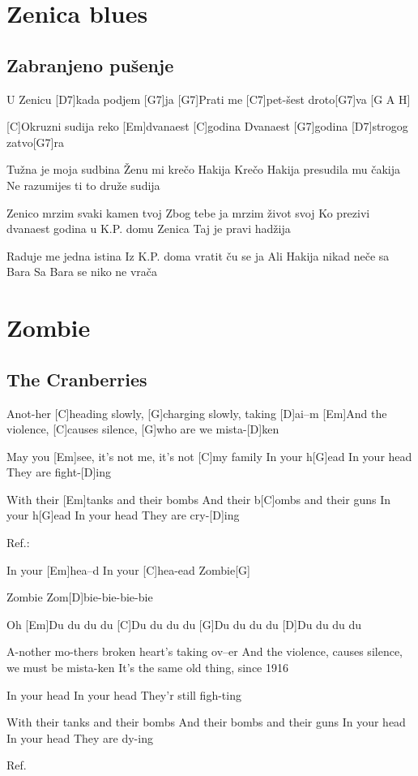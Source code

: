 \documentclass[a4paper,12pt]{article}
\begin{document}
\begin{multicols}{2}
\begin{guitar}
\end{guitar}
\section{Zenica blues}
\subsection*{Zabranjeno pušenje}
\begin{guitar}
[G7]U Zenicu [D7]kada podjem [G7]ja
[G7]Prati me [C7]pet-šest droto[G7]va [G A H]

[C]Okruzni sudija reko [Em]dvanaest [C]godina   
Dvanaest [G7]godina [D7]strogog zatvo[G7]ra      


Tužna je moja sudbina
Ženu mi krečo Hakija
Krečo Hakija presudila mu čakija
Ne razumijes ti to druže sudija


Zenico mrzim svaki kamen tvoj
Zbog tebe ja mrzim život svoj
Ko prezivi dvanaest godina 
u K.P. domu Zenica
Taj je pravi hadžija


Raduje me jedna istina
Iz K.P. doma vratit ču se ja
Ali Hakija nikad neče sa Bara
Sa Bara se niko ne vrača

\end{guitar}
\section{Zombie}
\subsection*{The Cranberries}
\begin{guitar}
[Em]Anot-her [C]heading slowly, 
[G]charging slowly, taking [D]ai--m
[Em]And the violence, [C]causes silence, 
[G]who are we mista-[D]ken       


May you [Em]see, it's not me, 
it's not [C]my family
In your h[G]ead
In your head
They are fight-[D]ing

	 
With their [Em]tanks and their bombs
And their b[C]ombs and their guns
In your h[G]ead
In your head
They are cry-[D]ing


Ref.:


In your [Em]hea--d
In your [C]hea-ead
Zombie[G] 

Zombie
Zom[D]bie-bie-bie-bie     


Oh
[Em]Du du du du            
[C]Du du du du            
[G]Du du du du            
[D]Du du du du            


A-nother mo-thers broken
heart's taking ov--er
And the violence, causes silence, 
we must be mista-ken
It's the same old thing, since 1916


In your head
In your head
They'r still figh-ting

               
With their tanks and their bombs
And their bombs and their guns
In your head
In your head
They are dy-ing


Ref. 

\end{guitar}
\end{multicols}
\end{document}

